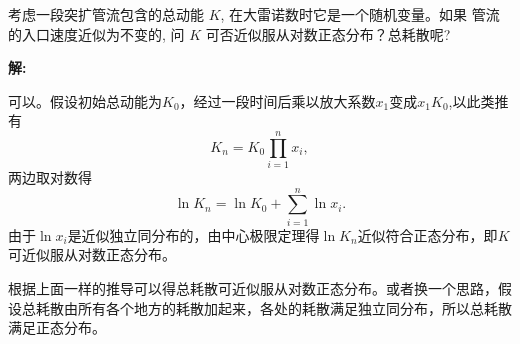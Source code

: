 \documentclass[12pt,a4]{ctexart}
\begin{document}
考虑一段突扩管流包含的总动能 $K$, 在大雷诺数时它是一个随机变量。如果 管流的入口速度近似为不变的, 问 $K$ 可否近似服从对数正态分布？总耗散呢?

\textsf{\hspace{-2em}\sf  \textbf{解:}}

可以。假设初始总动能为$K_0$，经过一段时间后乘以放大系数$x_1$变成$x_1K_0$,以此类推有
\begin{equation}
	K_n = K_0 \prod_{i=1}^{n} x_i,
\end{equation}
两边取对数得
\begin{equation}
	\ln K_n = \ln K_0 +  \sum_{i=1}^{n} \ln x_i.
\end{equation}
由于$\ln x_i$是近似独立同分布的，由中心极限定理得$\ln K_n$近似符合正态分布，即$K$可近似服从对数正态分布。

根据上面一样的推导可以得总耗散可近似服从对数正态分布。或者换一个思路，假设总耗散由所有各个地方的耗散加起来，各处的耗散满足独立同分布，所以总耗散满足正态分布。




\end{document}

